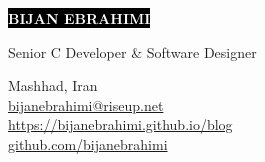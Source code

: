 \documentclass[12pt]{developercv}
\begin{document}
\begin{minipage}[t]{0.65\textwidth} %
	\vspace{-\baselineskip} %
	
	\colorbox{black}{{\HUGE\textcolor{white}{\textbf{\MakeUppercase{Bijan Ebrahimi}}}}} %
	
	\vspace{6pt}
	
	{\huge Senior C Developer \& Software Designer}\\ %
	{}
\end{minipage}
\begin{minipage}[t]{0.35\textwidth} %
	\vspace{-\baselineskip} %
	
	{Mashhad, Iran}\\
	{\href{mailto:bijanebrahimi@riseup.net}{bijanebrahimi@riseup.net}}\\	
	{\href{https://bijanebrahimi.github.io/blog}{https://bijanebrahimi.github.io/blog}}\\
	{\href{https://github.com/bijanebrahimi}{github.com/bijanebrahimi}}\\
\end{minipage}

\vspace{0.5cm}


\end{document}
